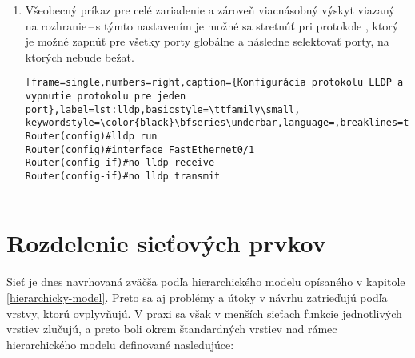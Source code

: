 \begin{enumerate}
\begin{minipage}{\linewidth}		
\begin{lstlisting}[frame=single,numbers=right,caption={Konfigurácia autentizácie OSPF na porte alebo v proccese},label=lst:ospf-auth,basicstyle=\ttfamily\small, keywordstyle=\color{black}\bfseries\underbar,language=,breaklines=true]
Router(config)#interface FastEthernet0/1
Router(config-if)#ip ospf message-digest-key 1 md5 heslo
Router(config-if)#ip ospf authentication message-digest

Router(config)#router ospf 1
Router(config)#area 0 authentication message-digest
Router(config)#area 0 authentication key-chain 1
\end{lstlisting}
\end{minipage}
	
	
	\item \vspace{2em} Všeobecný príkaz pre celé zariadenie a zároveň viacnásobný výskyt viazaný na rozhranie\,--\,s týmto nastavením je možné sa stretnúť pri protokole , ktorý je možné zapnúť pre všetky porty globálne a následne selektovať porty, na ktorých nebude bežať.
	
\begin{minipage}{\linewidth}		
\begin{lstlisting}[frame=single,numbers=right,caption={Konfigurácia protokolu LLDP a vypnutie protokolu pre jeden port},label=lst:lldp,basicstyle=\ttfamily\small, keywordstyle=\color{black}\bfseries\underbar,language=,breaklines=true]
Router(config)#lldp run
Router(config)#interface FastEthernet0/1
Router(config-if)#no lldp receive
Router(config-if)#no lldp transmit
		

\end{lstlisting}
\end{minipage}
	
\end{enumerate}

\section{Rozdelenie sieťových prvkov}
Sieť je dnes navrhovaná zväčša podľa hierarchického modelu opísaného v kapitole \ref{hierarchicky-model}. Preto sa aj problémy a útoky v návrhu zatrieďujú podľa vrstvy, ktorú ovplyvňujú. V praxi sa však v menších sieťach funkcie jednotlivých vrstiev zlučujú, a preto boli okrem štandardných vrstiev nad rámec hierarchického modelu definované nasledujúce:

